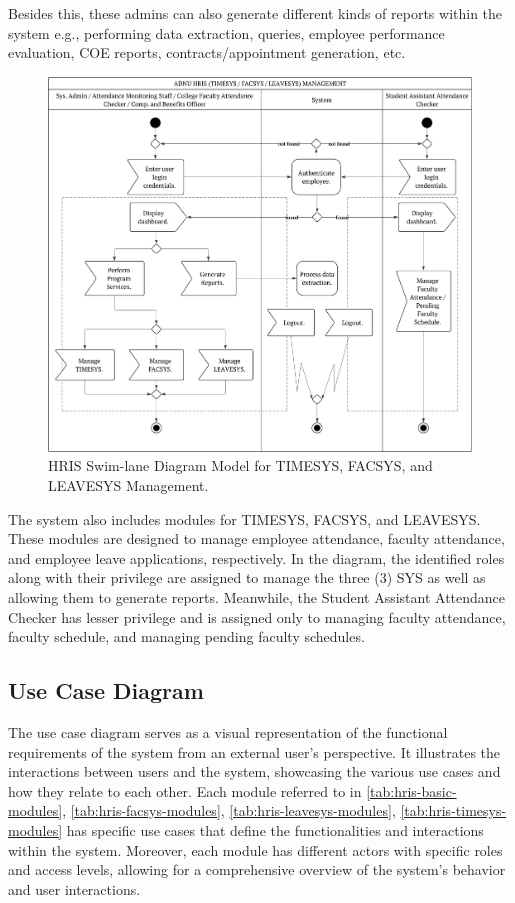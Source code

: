     Besides this, these admins can also generate different kinds of reports within the system e.g., performing data extraction, queries, employee performance evaluation, COE reports, contracts/appointment generation, etc.

    \begin{figure}[H]
        \centering
        \includegraphics[width=1\linewidth]{figures/images/diagrams/swimlane/swimlane-sys-mgt.png}
        \caption{HRIS Swim-lane Diagram Model for TIMESYS, FACSYS, and LEAVESYS Management.}
        \label{fig:swimlane-sys-mgt}
    \end{figure}

    The system also includes modules for TIMESYS, FACSYS, and LEAVESYS. These modules are designed to manage employee attendance, faculty attendance, and employee leave applications, respectively. In the diagram, the identified roles along with their privilege are assigned to manage the three (3) SYS as well as allowing them to generate reports. Meanwhile, the Student Assistant Attendance Checker has lesser privilege and is assigned only to managing faculty attendance, faculty schedule, and managing pending faculty schedules.

    \subsection{Use Case Diagram}
    
    The use case diagram serves as a visual representation of the functional requirements of the system from an external user's perspective. It illustrates the interactions between users and the system, showcasing the various use cases and how they relate to each other. Each module referred to in \ref*{tab:hris-basic-modules}, \ref*{tab:hris-facsys-modules}, \ref*{tab:hris-leavesys-modules}, \ref*{tab:hris-timesys-modules} has specific use cases that define the functionalities and interactions within the system. Moreover, each module has different actors with specific roles and access levels, allowing for a comprehensive overview of the system's behavior and user interactions.
    
